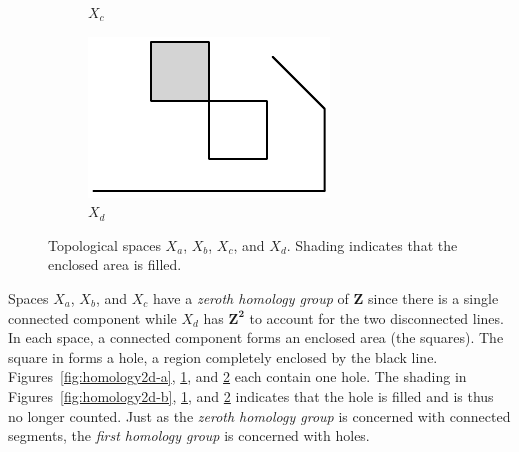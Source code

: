 \begin{figure}[h]
\begin{subfigure}[b]{0.2\textwidth}
		\caption{$X_c$} \label{fig:homology2d-c}
	\end{subfigure} \qquad
	\begin{subfigure}[b]{0.2\textwidth}
		\includegraphics[width=\textwidth]{Figs/homology2d-d.pdf}
		\caption{$X_d$} \label{fig:homology2d-d}
	\end{subfigure}
	\caption{Topological spaces $X_a$, $X_b$, $X_c$, and $X_d$. Shading indicates that the enclosed area is filled.} \label{fig:homology2d}
\end{figure}

Spaces $X_a$, $X_b$, and $X_c$ have a \textit{zeroth homology group} of $\mathbf{Z}$ since there is a single connected component while $X_d$ has $\mathbf{Z^2}$ to account for the two disconnected lines. In each space, a connected component forms an enclosed area (\ie the squares). The square in  forms a hole, a region completely enclosed by the black line. Figures~\ref{fig:homology2d-a}, \ref{fig:homology2d-c}, and \ref{fig:homology2d-d} each contain one hole. The shading in Figures~\ref{fig:homology2d-b}, \ref{fig:homology2d-c}, and \ref{fig:homology2d-d} indicates that the hole is filled and is thus no longer counted. Just as the \textit{zeroth homology group} is concerned with connected segments, the \textit{first homology group} is concerned with holes.

